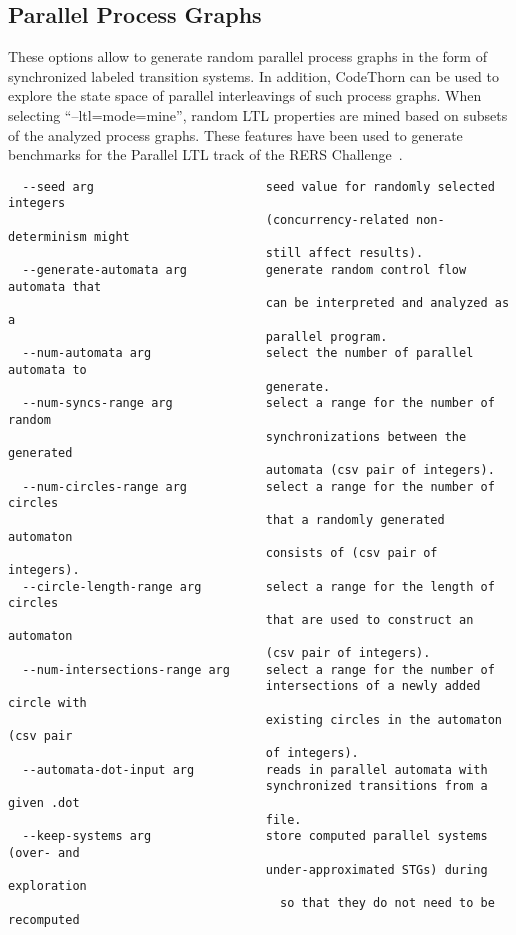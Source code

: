 \documentclass[natbib]{article}
\newcommand{\enquote}[1]{``#1''}
\begin{document}
\subsection{Parallel Process Graphs}
These options allow to generate random parallel process graphs in the form of synchronized labeled transition systems.
In addition, CodeThorn can be used to explore the state space of parallel interleavings of such process graphs. 
When selecting \enquote{--ltl=mode=mine}, random LTL properties are mined based on subsets of the analyzed process graphs. 
These features have been used to generate benchmarks for the Parallel LTL track of the RERS Challenge~\cite{jasper2017rers}.
\begin{verbatim}
  --seed arg                        seed value for randomly selected integers 
                                    (concurrency-related non-determinism might 
                                    still affect results).
  --generate-automata arg           generate random control flow automata that 
                                    can be interpreted and analyzed as a 
                                    parallel program.
  --num-automata arg                select the number of parallel automata to 
                                    generate.
  --num-syncs-range arg             select a range for the number of random 
                                    synchronizations between the generated 
                                    automata (csv pair of integers).
  --num-circles-range arg           select a range for the number of circles 
                                    that a randomly generated automaton 
                                    consists of (csv pair of integers).
  --circle-length-range arg         select a range for the length of circles 
                                    that are used to construct an automaton 
                                    (csv pair of integers).
  --num-intersections-range arg     select a range for the number of 
                                    intersections of a newly added circle with 
                                    existing circles in the automaton (csv pair
                                    of integers).
  --automata-dot-input arg          reads in parallel automata with 
                                    synchronized transitions from a given .dot 
                                    file.
  --keep-systems arg                store computed parallel systems (over- and 
                                    under-approximated STGs) during exploration
                                      so that they do not need to be recomputed

\end{verbatim}
\end{document}
